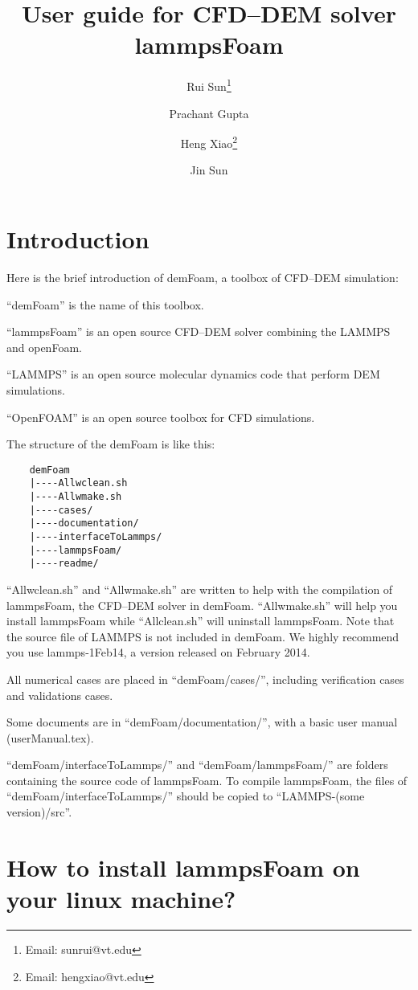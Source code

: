 \documentclass[11pt]{article}
\title{User guide for CFD--DEM solver lammpsFoam}
\author[1]{Rui Sun\thanks{Email: sunrui@vt.edu}}
\author[2]{Prachant Gupta}
\author[1]{Heng Xiao\thanks{Email: hengxiao@vt.edu}}
\author[2]{Jin Sun}
\affil[1]{Department of Aerospace and Ocean Engineering, Virginia Tech, United States}
\affil[2]{Institute for Infrastructure and Environment, The University of Edinburgh, UK}
\date{}
\begin{document}
\maketitle

\section{Introduction}

Here is the brief introduction of demFoam, a toolbox of CFD--DEM simulation:

``demFoam'' is the name of this toolbox. 

``lammpsFoam'' is an open source CFD--DEM solver combining the LAMMPS and openFoam.

``LAMMPS'' is an open source molecular dynamics code that perform DEM simulations.

``OpenFOAM'' is an open source toolbox for CFD simulations.

The structure of the demFoam is like this:

\begin{lstlisting}
    demFoam
    |----Allwclean.sh
    |----Allwmake.sh
    |----cases/
    |----documentation/
    |----interfaceToLammps/
    |----lammpsFoam/
    |----readme/
\end{lstlisting}

``Allwclean.sh'' and ``Allwmake.sh'' are written to help with the compilation of lammpsFoam, the
CFD--DEM solver in demFoam. ``Allwmake.sh'' will help you install lammpsFoam while ``Allclean.sh''
will uninstall lammpsFoam. Note that the source file of LAMMPS is not included in demFoam. We highly
recommend you use lammps-1Feb14, a version released on February 2014.

All numerical cases are placed in ``demFoam/cases/'', including verification cases and validations cases.

Some documents are in ``demFoam/documentation/'', with a basic user manual (userManual.tex).

``demFoam/interfaceToLammps/'' and ``demFoam/lammpsFoam/'' are folders containing the source code of
lammpsFoam. To compile lammpsFoam, the files of ``demFoam/interfaceToLammps/'' should be copied to
``LAMMPS-(some version)/src''.

\section{How to install lammpsFoam on your linux machine?}
\end{document}
